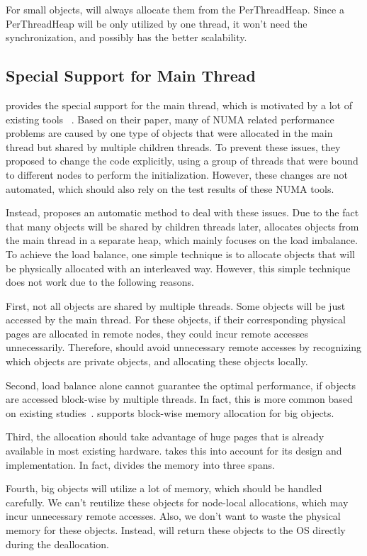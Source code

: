 For small objects, \NM{} will always allocate them from the PerThreadHeap. Since a PerThreadHeap will be only utilized by one thread, it won't need the synchronization, and possibly has the better scalability. 

\subsection{Special Support for Main Thread}
\NM{} provides the special support for the main thread, which is motivated by a lot of existing tools ~\cite{XULIU, MemProf}. Based on their paper, many of NUMA related performance problems are caused by one type of objects that were allocated in the main thread but shared by multiple children threads. To prevent these issues, they proposed to change the code explicitly, using a group of threads that were bound to different nodes to perform the initialization. However, these changes are not automated, which should also rely on the test results of these NUMA tools.  

Instead, \NM{} proposes an automatic method to deal with these issues. Due to the fact that many objects will be shared by children threads later, \NM{} allocates objects from the main thread in a separate heap, which mainly focuses on the load imbalance. To achieve the load balance, one simple technique is to allocate objects that will be physically allocated with an interleaved way. However, this simple technique does not work due to the following reasons. 

First, not all objects are shared by multiple threads. Some objects will be just accessed by the main thread. For these objects, if their corresponding physical pages are allocated in remote nodes, they could  incur remote accesses unnecessarily. Therefore, \NM{} should avoid unnecessary remote accesses by recognizing which objects are private objects, and allocating these objects locally.  

Second, load balance alone cannot guarantee the optimal performance, if objects are accessed block-wise by multiple threads. In fact, this is more common based on existing studies~\cite{XULIU, MemProf}. \NM{} supports block-wise memory allocation for big objects.  

Third, the allocation should take advantage of huge pages that is already available in most existing hardware. \NM{} takes this into account for its design and implementation. In fact, \NM{} divides the memory into three spans. 

Fourth, big objects will utilize a lot of memory, which should be handled carefully. We can't reutilize these objects for node-local allocations, which may incur unnecessary remote accesses. Also, we don't want to waste the physical memory for these objects. Instead, \NM{}  will return these objects to the OS directly during the deallocation. 

